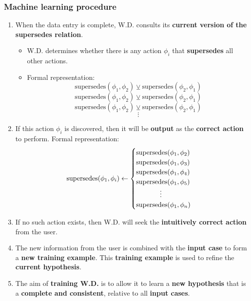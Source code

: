 \documentclass[11pt]{article}
\begin{document}
\subsubsection{Machine learning procedure}
\label{sec:orga465789}
\begin{enumerate}
\item When the data entry is complete, W.D. consults its \textbf{current version of the supersedes relation}.
\begin{itemize}
\item W.D. determines whether there is any action \(\phi_i\) that \textbf{supersedes} all other actions.
\item Formal representation:
\[\text{supersedes}(\phi_1, \phi_2) \veebar \text{supersedes}(\phi_2 , \phi_1)\]
\[\text{supersedes}(\phi_1, \phi_2) \veebar \text{supersedes}(\phi_2 , \phi_1)\]
\[\text{supersedes}(\phi_1, \phi_2) \veebar \text{supersedes}(\phi_2 , \phi_1)\]
\[\vdots\]
\end{itemize}
\item If this action \(\phi_i\) is discovered, then it will be \textbf{output} as the \textbf{correct action} to perform.
Formal representation:
\begin{displaymath}
\text{supersedes}(\phi_1, \phi_i) \leftarrow \begin{cases}
\text{supersedes}(\phi_1, \phi_2) \\
\text{supersedes}(\phi_1, \phi_3) \\
\text{supersedes}(\phi_1, \phi_4) \\
\text{supersedes}(\phi_1, \phi_5) \\
\hspace*{3.5em} \vdots \\
\text{supersedes}(\phi_1, \phi_n) \\
\end{cases}
\end{displaymath}
\item If no such action exists, then W.D. will seek the \textbf{intuitively correct action} from the user.
\item The new information from the user is combined with the \textbf{input case} to form a \textbf{new training example}. This \textbf{training example} is used to refine the \textbf{current hypothesis}.
\item The aim of \textbf{training W.D.} is to allow it to learn a \textbf{new hypothesis} that is a \textbf{complete and consistent}, relative to all \textbf{input cases}.
\end{enumerate}
\end{document}
